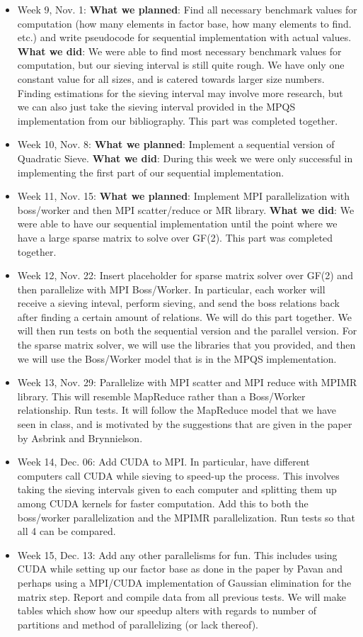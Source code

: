 \documentclass[11pt]{article}
\begin{document}
\begin{itemize}
 \item Week 9, Nov. 1: \textbf{What we planned}: Find all necessary benchmark values for computation (how many elements in factor base, how many elements to find. etc.) and write pseudocode for sequential implementation with actual values. \textbf{What we did}: We were able to find most necessary benchmark values for computation, but our sieving interval is still quite rough. We have only one constant value for all sizes, and is catered towards larger size numbers. Finding estimations for the sieving interval may involve more research, but we can also just take the sieving interval provided in the MPQS implementation from our bibliography. This part was completed together.
 \item Week 10, Nov. 8: \textbf{What we planned}: Implement a sequential version of Quadratic Sieve. \textbf{What we did}: During this week we were only successful in implementing the first part of our sequential implementation.
 \item Week 11, Nov. 15: \textbf{What we planned}: Implement MPI parallelization with boss/worker and then MPI scatter/reduce or MR library. \textbf{What we did}: We were able to have our sequential implementation until the point where we have a large sparse matrix to solve over GF(2). This part was completed together.
 \item Week 12, Nov. 22: Insert placeholder for sparse matrix solver over GF(2) and then parallelize with MPI Boss/Worker. In particular, each worker will receive a sieving inteval, perform sieving, and send the boss relations back after finding a certain amount of relations. We will do this part together. We will then run tests on both the sequential version and the parallel version. For the sparse matrix solver, we will use the libraries that you provided, and then we will use the Boss/Worker model that is in the MPQS implementation.
 \item Week 13, Nov. 29: Parallelize with MPI scatter and MPI reduce with MPIMR library. This will resemble MapReduce rather than a Boss/Worker relationship. Run tests. It will follow the MapReduce model that we have seen in class, and is motivated by the suggestions that are given in the paper by Asbrink and Brynnielson.
 \item Week 14, Dec. 06: Add CUDA to MPI. In particular, have different computers call CUDA while sieving to speed-up the process. This involves taking the sieving intervals given to each computer and splitting them up among CUDA kernels for faster computation. Add this to both the boss/worker parallelization and the MPIMR parallelization. Run tests so that all 4 can be compared.
 \item Week 15, Dec. 13: Add any other parallelisms for fun. This includes using CUDA while setting up our factor base as done in the paper by Pavan and perhaps using a MPI/CUDA implementation of Gaussian elimination for the matrix step. Report and compile data from all previous tests. We will make tables which show how our speedup alters with regards to number of partitions and method of parallelizing (or lack thereof).
\end{itemize}
\end{document}
